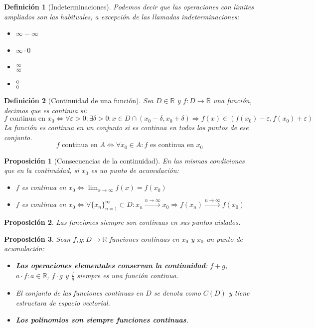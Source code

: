 \documentclass[10pt,a4paper,openright]{book}
\newtheorem{proposicion}{Proposición}[chapter]
\newtheorem{definicion}{Definición}[chapter]
\begin{document}
\begin{definicion}[Indeterminaciones]
Podemos decir que las operaciones con límites ampliados son las habituales, a excepción de las llamadas indeterminaciones:
\begin{itemize}
\item $\infty -\infty$
\item $\infty \cdot 0$
\item $\frac{\infty}{\infty}$
\item $\frac{0}{0}$
\end{itemize}
\end{definicion}

\begin{definicion}[Continuidad de una función]
Sea $D\in \mathbb R$ y $f: D\rightarrow \mathbb R$ una función, decimos que es continua si:
$$f\mbox{ continua en }x_0\Leftrightarrow \forall \varepsilon>0 :\exists \delta>0: x\in D\cap (x_0-\delta, x_0+\delta)\Rightarrow f(x)\in (f(x_0)-\varepsilon, f(x_0)+\varepsilon)$$
La función es continua en un conjunto si es continua en todos los puntos de ese conjunto.
$$f\mbox{ continua en }A\Leftrightarrow \forall x_0 \in A: f\mbox{ es continua en }x_0$$
\end{definicion}

\begin{proposicion}[Consecuencias de la continuidad]
En las mismas condiciones que en la continuidad, si $x_0$ es un punto de acumulación:
\begin{itemize}
\item $f$ es continua en $x_0\Leftrightarrow \lim_{x\rightarrow \infty}f(x)=f(x_0)$
\item $f$ es continua en $x_0\Leftrightarrow \forall \{x_n\}_{n=1}^\infty\subset D: x_n\xrightarrow{n\rightarrow \infty}x_0\Rightarrow f(x_n)\xrightarrow{n\rightarrow\infty}f(x_0)$
\end{itemize}
\end{proposicion}

\begin{proposicion}
Las funciones siempre son continuas en sus puntos aislados.
\end{proposicion}

\begin{proposicion}
Sean $f,g: D\rightarrow \mathbb R$ funciones continuas en $x_0$ y $x_0$ un punto de acumulación:
\begin{itemize}
\item \textbf{Las operaciones elementales conservan la continuidad}: $f+g$, $a\cdot f: a\in \mathbb R$, $f\cdot g$ y $\frac{f}{g}$ siempre es una función continua.

\item El conjunto de las funciones continuas en $D$ se denota como $C(D)$ y tiene estructura de espacio vectorial.

\item \textbf{Los polinomios son siempre funciones continuas}.
\end{itemize}
\end{proposicion}
\end{document}
